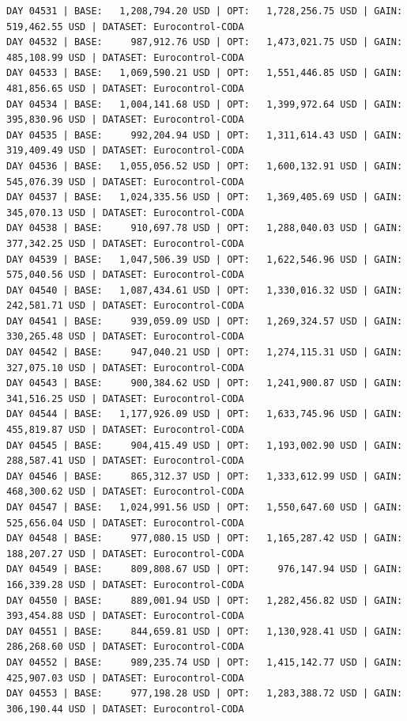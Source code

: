 \documentclass[11pt,a4paper]{article}
\begin{document}
\begin{verbatim}
DAY 04531 | BASE:   1,208,794.20 USD | OPT:   1,728,256.75 USD | GAIN: 519,462.55 USD | DATASET: Eurocontrol-CODA
DAY 04532 | BASE:     987,912.76 USD | OPT:   1,473,021.75 USD | GAIN: 485,108.99 USD | DATASET: Eurocontrol-CODA
DAY 04533 | BASE:   1,069,590.21 USD | OPT:   1,551,446.85 USD | GAIN: 481,856.65 USD | DATASET: Eurocontrol-CODA
DAY 04534 | BASE:   1,004,141.68 USD | OPT:   1,399,972.64 USD | GAIN: 395,830.96 USD | DATASET: Eurocontrol-CODA
DAY 04535 | BASE:     992,204.94 USD | OPT:   1,311,614.43 USD | GAIN: 319,409.49 USD | DATASET: Eurocontrol-CODA
DAY 04536 | BASE:   1,055,056.52 USD | OPT:   1,600,132.91 USD | GAIN: 545,076.39 USD | DATASET: Eurocontrol-CODA
DAY 04537 | BASE:   1,024,335.56 USD | OPT:   1,369,405.69 USD | GAIN: 345,070.13 USD | DATASET: Eurocontrol-CODA
DAY 04538 | BASE:     910,697.78 USD | OPT:   1,288,040.03 USD | GAIN: 377,342.25 USD | DATASET: Eurocontrol-CODA
DAY 04539 | BASE:   1,047,506.39 USD | OPT:   1,622,546.96 USD | GAIN: 575,040.56 USD | DATASET: Eurocontrol-CODA
DAY 04540 | BASE:   1,087,434.61 USD | OPT:   1,330,016.32 USD | GAIN: 242,581.71 USD | DATASET: Eurocontrol-CODA
DAY 04541 | BASE:     939,059.09 USD | OPT:   1,269,324.57 USD | GAIN: 330,265.48 USD | DATASET: Eurocontrol-CODA
DAY 04542 | BASE:     947,040.21 USD | OPT:   1,274,115.31 USD | GAIN: 327,075.10 USD | DATASET: Eurocontrol-CODA
DAY 04543 | BASE:     900,384.62 USD | OPT:   1,241,900.87 USD | GAIN: 341,516.25 USD | DATASET: Eurocontrol-CODA
DAY 04544 | BASE:   1,177,926.09 USD | OPT:   1,633,745.96 USD | GAIN: 455,819.87 USD | DATASET: Eurocontrol-CODA
DAY 04545 | BASE:     904,415.49 USD | OPT:   1,193,002.90 USD | GAIN: 288,587.41 USD | DATASET: Eurocontrol-CODA
DAY 04546 | BASE:     865,312.37 USD | OPT:   1,333,612.99 USD | GAIN: 468,300.62 USD | DATASET: Eurocontrol-CODA
DAY 04547 | BASE:   1,024,991.56 USD | OPT:   1,550,647.60 USD | GAIN: 525,656.04 USD | DATASET: Eurocontrol-CODA
DAY 04548 | BASE:     977,080.15 USD | OPT:   1,165,287.42 USD | GAIN: 188,207.27 USD | DATASET: Eurocontrol-CODA
DAY 04549 | BASE:     809,808.67 USD | OPT:     976,147.94 USD | GAIN: 166,339.28 USD | DATASET: Eurocontrol-CODA
DAY 04550 | BASE:     889,001.94 USD | OPT:   1,282,456.82 USD | GAIN: 393,454.88 USD | DATASET: Eurocontrol-CODA
DAY 04551 | BASE:     844,659.81 USD | OPT:   1,130,928.41 USD | GAIN: 286,268.60 USD | DATASET: Eurocontrol-CODA
DAY 04552 | BASE:     989,235.74 USD | OPT:   1,415,142.77 USD | GAIN: 425,907.03 USD | DATASET: Eurocontrol-CODA
DAY 04553 | BASE:     977,198.28 USD | OPT:   1,283,388.72 USD | GAIN: 306,190.44 USD | DATASET: Eurocontrol-CODA

\end{verbatim}
\end{document}
